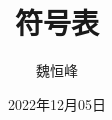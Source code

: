 \documentclass[]{beamer}
\title[语义分析]{符号表}
\author[魏恒峰]{\large 魏恒峰}
\institute{hfwei@nju.edu.cn}
\date{2022年12月05日}
\begin{document}
\maketitle


\thankyou{}

\end{document}
